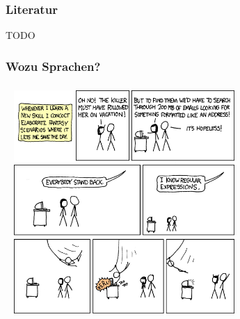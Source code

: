 \documentclass[onlymath]{beamer}
\begin{document}

\begin{frame}\frametitle{Literatur}

TODO

\end{frame}





\begin{frame}\frametitle{Wozu Sprachen?}

\end{frame}

\begin{frame}\frametitle{}

~\hfill
\includegraphics[height=8.5cm]{images/xkcd-regexps}
\hfill~

\end{frame}
\end{document}
